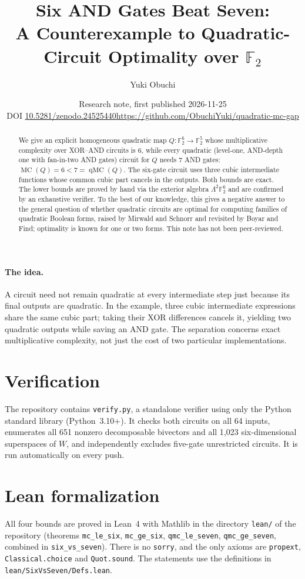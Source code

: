 \documentclass[11pt,a4paper]{article}
\title{Six AND Gates Beat Seven:\\ A Counterexample to Quadratic-Circuit Optimality over $\mathbb F_2$}
\author{Yuki Obuchi}
\date{Research note, first published 2026-11-25\\ \small DOI \href{https://doi.org/10.5281/zenodo.24525440}{10.5281/zenodo.24525440}\quad \url{https://github.com/ObuchiYuki/quadratic-mc-gap}}
\DeclareMathOperator{\MC}{MC}
\DeclareMathOperator{\qMC}{qMC}
\begin{document}
\maketitle
\begin{abstract}
We give an explicit homogeneous quadratic map $Q:\mathbb F_2^6\to\mathbb F_2^5$ whose multiplicative complexity over XOR--AND circuits is $6$, while every quadratic (level-one, AND-depth one with fan-in-two AND gates) circuit for $Q$ needs $7$ AND gates: $\MC(Q)=6<7=\qMC(Q)$. The six-gate circuit uses three cubic intermediate functions whose common cubic part cancels in the outputs. Both bounds are exact. The lower bounds are proved by hand via the exterior algebra $\Lambda^2\mathbb F_2^6$ and are confirmed by an exhaustive verifier. To the best of our knowledge, this gives a negative answer to the general question of whether quadratic circuits are optimal for computing families of quadratic Boolean forms, raised by Mirwald and Schnorr and revisited by Boyar and Find; optimality is known for one or two forms. This note has not been peer-reviewed.
\end{abstract}

\paragraph{The idea.} A circuit need not remain quadratic at every intermediate step just because its final outputs are quadratic. In the example, three cubic intermediate expressions share the same cubic part; taking their XOR differences cancels it, yielding two quadratic outputs while saving an AND gate. The separation concerns exact multiplicative complexity, not just the cost of two particular implementations.



\section*{Verification}
The repository contains \texttt{verify.py}, a standalone verifier using only the Python standard library (Python~3.10+). It checks both circuits on all 64 inputs, enumerates all 651 nonzero decomposable bivectors and all 1{,}023 six-dimensional superspaces of $W$, and independently excludes five-gate unrestricted circuits. It is run automatically on every push.

\section*{Lean formalization}
All four bounds are proved in Lean~4 with Mathlib in the directory \texttt{lean/} of the repository (theorems \texttt{mc\_le\_six}, \texttt{mc\_ge\_six}, \texttt{qmc\_le\_seven}, \texttt{qmc\_ge\_seven}, combined in \texttt{six\_vs\_seven}). There is no \texttt{sorry}, and the only axioms are \texttt{propext}, \texttt{Classical.choice} and \texttt{Quot.sound}. The statements use the definitions in \texttt{lean/SixVsSeven/Defs.lean}.
\end{document}
